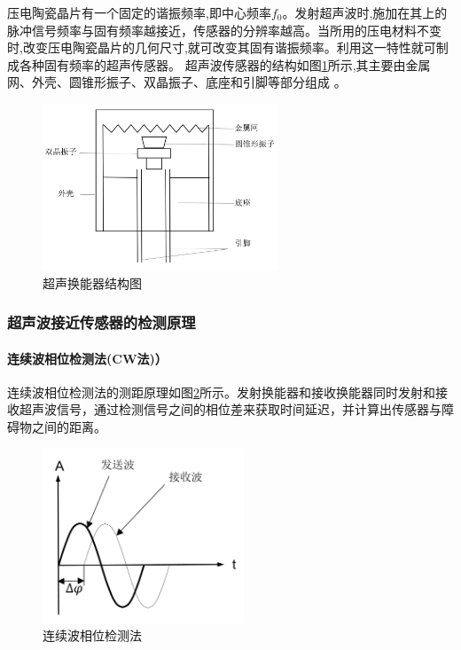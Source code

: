     压电陶瓷晶片有一个固定的谐振频率,即中心频率$f_0$。发射超声波时,施加在其上的脉冲信号频率与固有频率越接近，传感器的分辨率越高。当所用的压电材料不变时,改变压电陶瓷晶片的几何尺寸,就可改变其固有谐振频率。利用这一特性就可制成各种固有频率的超声传感器。
    超声波传感器的结构如图\ref{超声换能器结构图}所示,其主要由金属网、外壳、圆锥形振子、双晶振子、底座和引脚等部分组成 。
    \begin{figure}[!h]
    	\centering
    	\includegraphics[width=7cm]{figure/超声换能器结构图.png}
    	\caption{超声换能器结构图}
    	\label{超声换能器结构图}
    \end{figure}

    \subsubsection{超声波接近传感器的检测原理}
    \paragraph{连续波相位检测法(CW法)）}
    连续波相位检测法的测距原理如图\ref{连续波相位检测法}所示。发射换能器和接收换能器同时发射和接收超声波信号，通过检测信号之间的相位差来获取时间延迟，并计算出传感器与障碍物之间的距离。\par
    \begin{figure}[!h]
    	\centering
    	\includegraphics[width=6cm]{figure/连续波相位检测法.png}
    	\caption{连续波相位检测法}
    	\label{连续波相位检测法}
    \end{figure}\par


